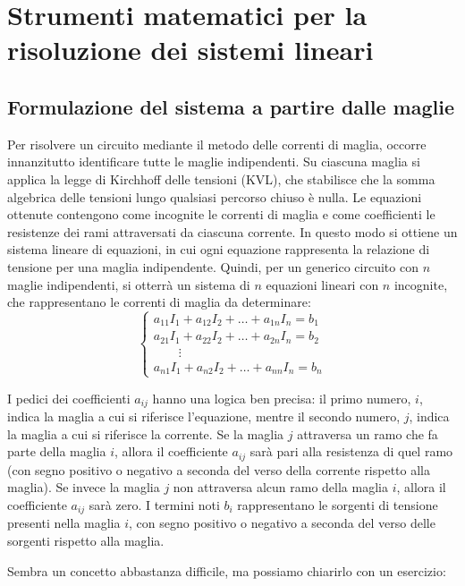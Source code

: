 \chapter{Strumenti matematici per la risoluzione dei sistemi lineari}

\section{Formulazione del sistema a partire dalle maglie}
Per risolvere un circuito mediante il metodo delle correnti di maglia, occorre innanzitutto identificare tutte le maglie indipendenti. Su ciascuna maglia si applica la legge di Kirchhoff delle tensioni (KVL), che stabilisce che la somma algebrica delle tensioni lungo qualsiasi percorso chiuso è nulla. Le equazioni ottenute contengono come incognite le correnti di maglia e come coefficienti le resistenze dei rami attraversati da ciascuna corrente. In questo modo si ottiene un sistema lineare di equazioni, in cui ogni equazione rappresenta la relazione di tensione per una maglia indipendente.
Quindi, per un generico circuito con $n$ maglie indipendenti, si otterrà un sistema di $n$ equazioni lineari con $n$ incognite, che rappresentano le correnti di maglia da determinare:
\begin{equation}
\begin{cases}
a_{11} I_1 + a_{12} I_2 + \ldots + a_{1n} I_n = b_1 \\
a_{21} I_1 + a_{22} I_2 + \ldots + a_{2n} I_n = b_2 \\
\qquad \vdots \\
a_{n1} I_1 + a_{n2} I_2 + \ldots + a_{nn} I_n = b_n
\end{cases}
\end{equation}

I pedici dei coefficienti $a_{ij}$ hanno una logica ben precisa: il primo numero, $i$, indica la maglia a cui si riferisce l’equazione, mentre il secondo numero, $j$, indica la maglia a cui si riferisce la corrente. Se la maglia $j$ attraversa un ramo che fa parte della maglia $i$, allora il coefficiente $a_{ij}$ sarà pari alla resistenza di quel ramo (con segno positivo o negativo a seconda del verso della corrente rispetto alla maglia). Se invece la maglia $j$ non attraversa alcun ramo della maglia $i$, allora il coefficiente $a_{ij}$ sarà zero. I termini noti $b_i$ rappresentano le sorgenti di tensione presenti nella maglia $i$, con segno positivo o negativo a seconda del verso delle sorgenti rispetto alla maglia.

Sembra un concetto abbastanza difficile, ma possiamo chiarirlo con un esercizio:

